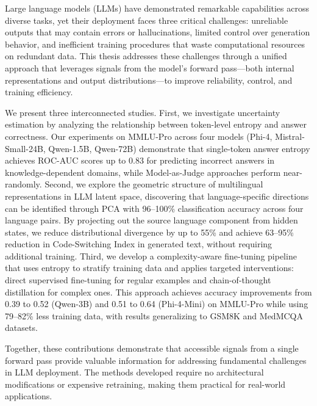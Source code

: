 Large language models (LLMs) have demonstrated remarkable capabilities across diverse tasks, yet their deployment faces three critical challenges: unreliable outputs that may contain errors or hallucinations, limited control over generation behavior, and inefficient training procedures that waste computational resources on redundant data. This thesis addresses these challenges through a unified approach that leverages signals from the model's forward pass---both internal representations and output distributions---to improve reliability, control, and training efficiency.

We present three interconnected studies. First, we investigate uncertainty estimation by analyzing the relationship between token-level entropy and answer correctness. Our experiments on MMLU-Pro across four models (Phi-4, Mistral-Small-24B, Qwen-1.5B, Qwen-72B) demonstrate that single-token answer entropy achieves ROC-AUC scores up to 0.83 for predicting incorrect answers in knowledge-dependent domains, while Model-as-Judge approaches perform near-randomly. Second, we explore the geometric structure of multilingual representations in LLM latent space, discovering that language-specific directions can be identified through PCA with 96--100\% classification accuracy across four language pairs. By projecting out the source language component from hidden states, we reduce distributional divergence by up to 55\% and achieve 63--95\% reduction in Code-Switching Index in generated text, without requiring additional training. Third, we develop a complexity-aware fine-tuning pipeline that uses entropy to stratify training data and applies targeted interventions: direct supervised fine-tuning for regular examples and chain-of-thought distillation for complex ones. This approach achieves accuracy improvements from 0.39 to 0.52 (Qwen-3B) and 0.51 to 0.64 (Phi-4-Mini) on MMLU-Pro while using 79--82\% less training data, with results generalizing to GSM8K and MedMCQA datasets.

Together, these contributions demonstrate that accessible signals from a single forward pass provide valuable information for addressing fundamental challenges in LLM deployment. The methods developed require no architectural modifications or expensive retraining, making them practical for real-world applications.
